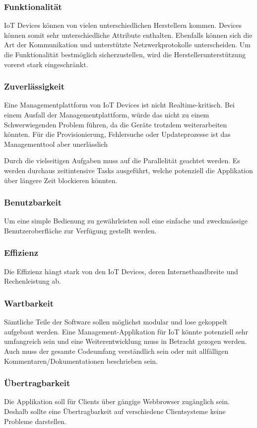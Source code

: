 \subsubsection{Funktionalität}
IoT Devices können von vielen unterschiedlichen Herstellern kommen. Devices können somit sehr unterschiedliche Attribute enthalten. Ebenfalls können sich die Art der Kommunikation und unterstützte Netzwerkprotokolle unterscheiden. Um die Funktionalität bestmöglich sicherzustellen, wird die Herstellerunterstützung vorerst stark eingeschränkt.
\subsubsection{Zuverlässigkeit}
Eine Managementplattform von IoT Devices ist nicht Realtime-kritisch. Bei einem Ausfall der Managementplattform, würde das nicht zu einem Schwerwiegenden Problem führen, da die Geräte trotzdem weiterarbeiten könnten. Für die Provisionierung, Fehlersuche oder Updateprozesse ist das Managementtool aber unerlässlich

Durch die vielseitigen Aufgaben muss auf die Parallelität geachtet werden. Es werden durchaus zeitintensive Tasks ausgeführt, welche potenziell die Applikation über längere Zeit blockieren könnten.
\subsubsection{Benutzbarkeit}
Um eine simple Bedienung zu gewährleisten soll eine einfache und zweckmässige Benutzeroberfläche zur Verfügung gestellt werden.
\subsubsection{Effizienz}
Die Effizienz hängt stark von den IoT Devices, deren Internetbandbreite und Rechenleistung ab.
\subsubsection{Wartbarkeit}
Sämtliche Teile der Software sollen möglichst modular und lose gekoppelt aufgebaut werden. Eine Management-Applikation für IoT könnte potenziell sehr umfangreich sein und eine Weiterentwicklung muss in Betracht gezogen werden. Auch muss der gesamte Codeumfang verständlich sein oder mit allfälligen Kommentaren/Dokumentationen beschrieben sein.
\subsubsection{Übertragbarkeit}
Die Applikation soll für Clients über gängige Webbrowser zugänglich sein. Deshalb sollte eine Übertragbarkeit auf verschiedene Clientsysteme keine Probleme darstellen.

